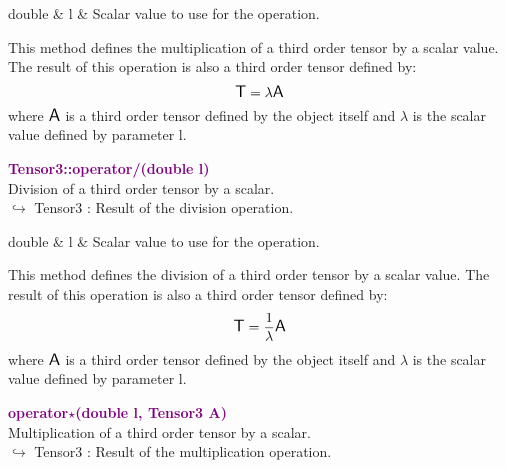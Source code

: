 \begin{tcolorbox}[width=\textwidth,myArgs,tabularx={ll|R}]
double & l & Scalar value to use for the operation.
\end{tcolorbox}

This method defines the multiplication of a third order tensor by a scalar value.
The result of this operation is also a third order tensor defined by:
\begin{equation*}
\mbox{\large\ensuremath{\mathsf{T}}} = \lambda \mbox{\large\ensuremath{\mathsf{A}}}
\end{equation*}
where $\mbox{\large\ensuremath{\mathsf{A}}}$ is a third order tensor defined by the object itself and $\lambda$ is the scalar value defined by parameter l.

\textcolor{purple}{\textbf{Tensor3::operator/(double l)}}\label{Tensor3::operator/(double l)}\\
Division of a third order tensor by a scalar.\\ \hspace*{10mm}$\hookrightarrow$ Tensor3 : Result of the division operation.

\begin{tcolorbox}[width=\textwidth,myArgs,tabularx={ll|R}]
double & l & Scalar value to use for the operation.
\end{tcolorbox}

This method defines the division of a third order tensor by a scalar value.
The result of this operation is also a third order tensor defined by:
\begin{equation*}
\mbox{\large\ensuremath{\mathsf{T}}} = \frac{1}{\lambda} \mbox{\large\ensuremath{\mathsf{A}}}
\end{equation*}
where $\mbox{\large\ensuremath{\mathsf{A}}}$ is a third order tensor defined by the object itself and $\lambda$ is the scalar value defined by parameter l.

\textcolor{purple}{\textbf{operator$\star$(double l, Tensor3 A)}}\label{operator*(double l, Tensor3 A)}\\
Multiplication of a third order tensor by a scalar.\\ \hspace*{10mm}$\hookrightarrow$ Tensor3 : Result of the multiplication operation.

